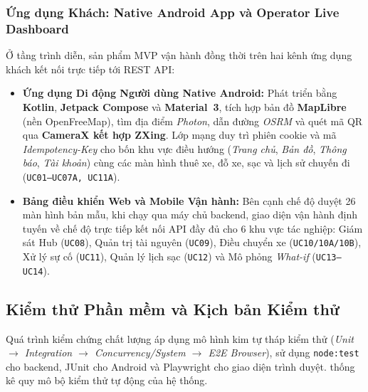 \subsubsection*{Ứng dụng Khách: Native Android App và Operator Live Dashboard}

Ở tầng trình diễn, sản phẩm MVP vận hành đồng thời trên hai kênh ứng dụng khách kết nối trực tiếp tới REST API:
\begin{itemize}[leftmargin=*,nosep]
    \item \textbf{Ứng dụng Di động Người dùng Native Android:} Phát triển bằng \textbf{Kotlin}, \textbf{Jetpack Compose} và \textbf{Material~3}, tích hợp bản đồ \textbf{MapLibre} (nền OpenFreeMap), tìm địa điểm \textit{Photon}, dẫn đường \textit{OSRM} và quét mã QR qua \textbf{CameraX kết hợp ZXing}. Lớp mạng duy trì phiên cookie và mã \textit{Idempotency-Key} cho bốn khu vực điều hướng (\textit{Trang chủ}, \textit{Bản đồ}, \textit{Thông báo}, \textit{Tài khoản}) cùng các màn hình thuê xe, đỗ xe, sạc và lịch sử chuyến đi (\texttt{UC01--UC07A, UC11A}).
    \item \textbf{Bảng điều khiển Web và Mobile Vận hành:} Bên cạnh chế độ duyệt 26 màn hình bản mẫu, khi chạy qua máy chủ backend, giao diện vận hành định tuyến về chế độ trực tiếp kết nối API đầy đủ cho 6 khu vực tác nghiệp: Giám sát Hub (\texttt{UC08}), Quản trị tài nguyên (\texttt{UC09}), Điều chuyển xe (\texttt{UC10/10A/10B}), Xử lý sự cố (\texttt{UC11}), Quản lý lịch sạc (\texttt{UC12}) và Mô phỏng \textit{What-if} (\texttt{UC13--UC14}).
\end{itemize}

\subsection{Kiểm thử Phần mềm và Kịch bản Kiểm thử}

Quá trình kiểm chứng chất lượng áp dụng mô hình kim tự tháp kiểm thử (\textit{Unit $\to$ Integration $\to$ Concurrency/System $\to$ E2E Browser}), sử dụng \texttt{node:test} cho backend, JUnit cho Android và Playwright cho giao diện trình duyệt.  thống kê quy mô bộ kiểm thử tự động của hệ thống.

